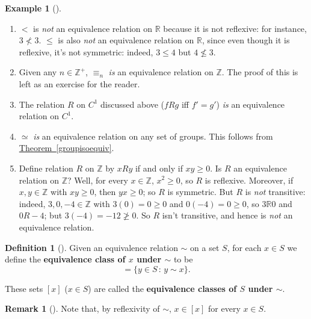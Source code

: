 \documentclass[10pt,openany,oneside]{book}
\newcommand{\terminology}[1]{\textbf{#1}}
\theoremstyle{plain}
\theoremstyle{definition}
\newtheorem{definition}[theorem]{Definition}
\theoremstyle{definition}
\newtheorem{remark}[theorem]{Remark}
\theoremstyle{definition}
\newtheorem{example}[theorem]{Example}
\theoremstyle{definition}
\numberwithin{equation}{section}
\def\Z{\mathbb{Z}}
\def\R{\mathbb{R}}
\newcommand{\lt}{<}
\begin{document}
\begin{example}[]\label{example-64}
\leavevmode%
\begin{enumerate}
\item\hypertarget{li-394}{}\(\lt\) is \emph{not} an equivalence relation on \(\R\) because it is not reflexive: for instance, \(3\not\lt  3\). \(\leq\) is also \emph{not} an equivalence relation on \(\R\), since even though it is reflexive, it's not symmetric: indeed, \(3\leq 4\) but \(4\not\leq 3\).%
\item\hypertarget{li-395}{}Given any \(n\in \Z^+\), \(\equiv_n\) \emph{is} an equivalence relation on \(\Z\).  The proof of this is left as an exercise for the reader.%
\item\hypertarget{li-396}{}The relation \(R\) on \(C^1\) discussed above (\(fR  g\) iff \(f'=g'\)) \emph{is} an equivalence relation on \(C^1\).%
\item\hypertarget{li-397}{}\(\simeq\) \emph{is} an equivalence relation on any set of groups. This follows from \hyperref[groupisoequiv]{Theorem~\ref{groupisoequiv}}.%
\item\hypertarget{li-398}{}Define relation \(R\) on \(\Z\) by \(xR y\) if and only if \(xy
\geq 0\).  Is \(R\) an equivalence relation on \(\Z\)?  Well, for every \(x\in \Z\), \(x^2\geq 0\), so \(R\) is reflexive.  Moreover, if \(x,y\in
\Z\) with \(xy \geq 0\), then \(yx \geq 0\); so \(R\) is symmetric.  But \(R\) is \emph{not} transitive: indeed, \(3,0,-4\in \Z\) with \(3(0)=0
\geq 0\) and \(0(-4)=0\geq 0\), so \(3\R 0\) and \(0 R -4\); but \(3(-4)=-12 \not \geq 0\).  So \(R\) isn't transitive, and hence is \emph{not} an equivalence relation.%
\end{enumerate}
%
\end{example}
\begin{definition}[{}]\label{definition-57}
\label{notation-65}
Given an equivalence relation \(\sim\) on a set \(S\), for each \(x\in S\) we define the \terminology{equivalence class of \(x\) under \(\sim\)} to be%
\begin{equation*}
[x]=\{y\in S\,:\, y\sim x\}.
\end{equation*}
%
\par
These sets \([x]\) (\(x\in S\)) are called the \terminology{equivalence classes of \(S\) under \(\sim\)}.%
\end{definition}
\begin{remark}[]\label{remark-36}
Note that, by reflexivity of \(\sim\), \(x\in [x]\) for every \(x\in S\).%
\end{remark}
\end{document}
